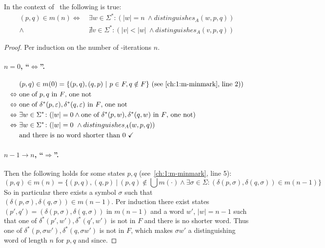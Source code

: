 \begin{lemma}\label{ch:3:semantics-of-m(n)}
    In the context of \CompDist\ the following is true:
    \begin{align*}
        (p,q) \in m(n) \Longleftrightarrow\ &\exists w\in\Sigma^*\colon (|w| = n\ \land distinguishes_A(w, p, q))\\
        \land\ &\nexists v\in\Sigma^*\colon (|v| < |w|\ \land distinguishes_A(v, p, q))
    \end{align*}
\end{lemma}

\begin{proof}
	Per induction on the number of \CompDist-iterations $n$.
	
	\paragraph*{$n = 0$, ``$\Leftrightarrow$''.}
	\begin{align*}
		&(p,q) \in m(0) = \{ (p,q), (q,p)\ |\ p \in F, q \notin F \}\hfill\text{ (see~\ref{ch:1:m-minmark}, line 2))}\\
		\Leftrightarrow\ &\text{one of $p,q$ in $F$, one not}\\
		\Leftrightarrow\ &\text{one of $\delta^*(p, \varepsilon),\delta^*(q, \varepsilon)$ in $F$, one not}\\
		\Leftrightarrow\ &\exists w\in\Sigma^*\colon (|w|=0\land\text{one of $\delta^*(p, w),\delta^*(q, w)$ in $F$, one not})\\
		\Leftrightarrow\ &\exists w\in\Sigma^*\colon (|w| = 0\ \land distinguishes_A(w, p, q))\\
		&\text{and there is no word shorter than $0$\ \checkmark}
	\end{align*}
	
	\paragraph*{$n-1 \rightarrow n$, ``$\Rightarrow$''.} 
	Then the following holds for some states $p,q$ (see~\ref{ch:1:m-minmark}, line 5):
	\[
		(p,q) \in m(n) = \{ (p,q), (q,p)\ |\ (p,q) \notin \bigcup{m(\cdot)} \land \exists \sigma \in \Sigma \colon (\delta(p,\sigma), \delta(q,\sigma)) \in m(n-1) \}
	\]
	So in particular there exists a symbol $\sigma$ such that $(\delta(p,\sigma),\delta(q,\sigma)) \in m(n-1)$. Per induction there exist states $(p',q')=(\delta(p,\sigma),\delta(q,\sigma))$ in $m(n-1)$ and a word $w'$, $|w|=n-1$ such that one of $\delta^*(p', w'),\delta^*(q', w')$ is not in $F$ and there is no shorter word. Thus one of $\delta^*(p, \sigma w'),\delta^*(q, \sigma w')$ is not in $F$, which makes $\sigma w'$ a distinguishing word of length $n$ for $p,q$ and since.
	

\end{proof}
